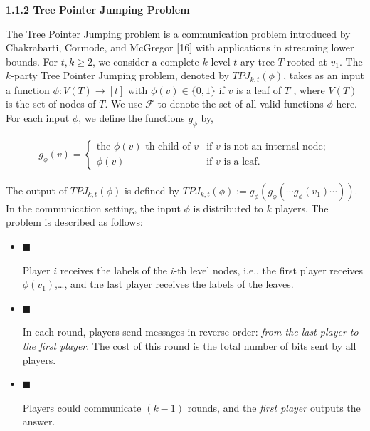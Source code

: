 \documentclass[10pt,a4paper]{article}
\begin{document}
\par\medskip\noindent\textbf{
1.1.2 Tree Pointer Jumping Problem}\par




The Tree Pointer Jumping problem is a communication problem introduced by Chakrabarti, Cormode, and McGregor [16] with applications in streaming lower bounds. For $t,k\geq 2$, we consider a complete $k$-level $t$-ary tree $T$ rooted at $v_{1}$. The $k$-party Tree Pointer Jumping problem, denoted by $\textit{TPJ}_{k,t}(\phi)$, takes as an input a function $\phi:V(T)\rightarrow[t]$ with $\phi(v)\in\{0,1\}$ if $v$ is a leaf of $T$ , where $V(T)$ is the set of nodes of $T$. We use $\mathcal{F}$ to denote the set of all valid functions $\phi$ here. For each input $\phi$, we define the functions $g_{\phi}$ by,\par


\[\begin{gathered}
g_{\phi}(v)=\begin{cases}\text{the $\phi(v)$-th child of $v$}&\text{if $v$ is not an internal node};\\
\phi(v)&\text{if $v$ is a leaf}.\end{cases}
\end{gathered}\]




The output of $TPJ_{k,t}(\phi)$ is defined by $TPJ_{k,t}(\phi):=g_{\phi}(g_{\phi}(\cdots g_{\phi}(v_{1})\cdots)).$ In the communication setting, the input $\phi$ is distributed to $k$ players. The problem is described as follows:\par




\begin{itemize}


\item[] 
$\blacksquare$ 


Player $i$ receives the labels of the $i$-th level nodes, i.e., the first player receives $\phi(v_{1})$,…, and the last player receives the labels of the leaves.\par





\item[] 
$\blacksquare$ 


In each round, players send messages in reverse order: \emph{from the last player to the first player}. The cost of this round is the total number of bits sent by all players.\par





\item[] 
$\blacksquare$ 


Players could communicate $(k-1)$ rounds, and the \emph{first player} outputs the answer.\par





\end{itemize}
\end{document}
